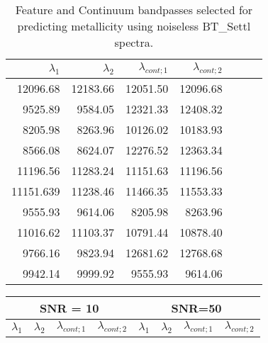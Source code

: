 \begin{appendix}

%
% 
\begin{table}
\begin{center}
\begin{tabular}{rrrrrrr}
  \hline
  $\lambda_1$ & $\lambda_2$ & $\lambda_{cont;1}$ & $\lambda_{cont;2} $ \\ 
  \hline
     12096.68 & 12183.66  & 12051.50 & 12096.68 \\
     9525.89 & 9584.05 	  & 12321.33 & 12408.32 \\
     8205.98 & 8263.96 	  & 10126.02 & 10183.93 \\
     8566.08 & 8624.07 	  & 12276.52 & 12363.34 \\
     11196.56 & 11283.24  & 11151.63 & 11196.56 \\
     11151.639 & 11238.46 & 11466.35 & 11553.33 \\
     9555.93 & 9614.06 	  & 8205.98  & 8263.96 \\
     11016.62 & 11103.37  & 10791.44 & 10878.40 \\
     9766.16 & 9823.94 	  & 12681.62 & 12768.68 \\
     9942.14 & 9999.92   & 9555.93  & 9614.06 \\
\hline
\end{tabular}
\caption {Feature and Continuum bandpasses selected for predicting metallicity 
      using noiseless BT\_Settl spectra.} \label{tab:irtf-met-noiseless}
\end{center}
\end{table}



\begin{table*}
\begin{center}
\begin{tabular}{rrrr | rrrr}
  \hline
 \multicolumn{4}{c}{SNR = 10} &  \multicolumn{4}{c}{SNR=50} \\
  \hline
$\lambda_1$ & $\lambda_2$ & $\lambda_{cont;1}$ & $\lambda_{cont;2} $ & $\lambda_1$ & $\lambda_2$ & $\lambda_{cont;1}$ & $\lambda_{cont;2} $ \\ 
  \hline


\end{tabular}
\end{center}
\end{table*}
\end{appendix}

